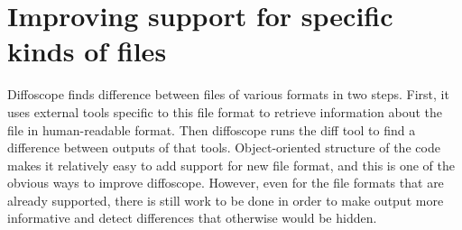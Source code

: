 \section{Improving support for specific kinds of files}


Diffoscope finds difference between files of various formats in two steps. First, it uses external
tools specific to this file format to retrieve information about the file in
human-readable format. Then diffoscope runs the diff tool to find a difference between outputs of that tools.
Object-oriented structure of the code makes it relatively easy to add support for
new file format, and this is one of the obvious ways to improve diffoscope.
However, even for the file formats that are already supported, there is still work
to be done in order to make output more informative and detect differences that
otherwise would be hidden.

